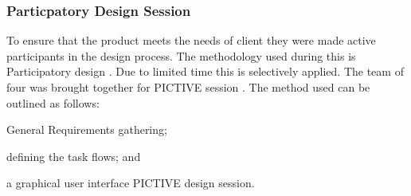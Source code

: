 \documentclass[12pt,a4paper]{report}
\begin{document}
\subsubsection{Particpatory Design Session}

To ensure that the product meets the needs of client they were made active participants
in the design process. The methodology used during this is Participatory design
\cite{muller1993participatory}. Due to limited time this is selectively applied. The
team of four was brought together for PICTIVE session \cite{muller1991pictive}.
The method used can be outlined as follows:
\begin{inparaenum}[(i)]
\item General Requirements gathering;
\item defining the task flows; and
\item a graphical user interface PICTIVE design session.
\end{inparaenum}
\end{document}
